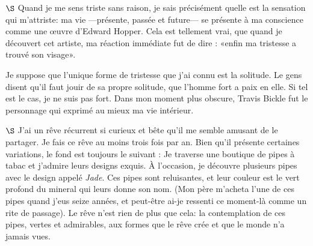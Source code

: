 \documentclass[a4paper, 12pt]{article}
\begin{document}
\pagebreak 

$\S$ Quand je me sens triste sans raison, je sais précisément quelle est la
sensation qui m'attriste: ma vie ---présente, passée et future--- se présente à
ma conscience comme une œuvre d'Edward Hopper. Cela est tellement vrai, que
quand je découvert cet artiste, ma réaction immédiate fut de dire : «enfin ma
tristesse a trouvé son visage».

Je suppose que l'unique forme de tristesse que j'ai connu est la solitude. Le
gens disent qu'il faut jouir de sa propre solitude, que l'homme fort a paix en
elle. Si tel est le cas, je ne suis pas fort. Dans mon moment plus obscure,
Travis Bickle fut le personnage qui exprimé au mieux ma vie intérieur.

\pagebreak 

$\S$ J'ai un rêve récurrent si curieux et bête qu'il me semble amusant de le
partager. Je fais ce rêve au moins trois fois par an. Bien qu'il présente
certaines variations, le fond est toujours le suivant : Je traverse une boutique
de pipes à tabac et j'admire leurs designs exquis. À l'occasion, je découvre
plusieurs pipes avec le design appelé \textit{Jade}. Ces pipes sont reluisantes,
et leur couleur est le vert profond du mineral qui leurs donne son nom. (Mon
père m'acheta l'une de ces pipes quand j'eus seize années, et peut-être ai-je
ressenti ce moment-là comme un rite de passage). Le rêve n'est rien de plus que
cela: la contemplation de ces pipes, vertes et admirables, aux formes que le
rêve crée et que le monde n'a jamais vues. 
\end{document}
